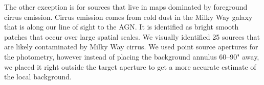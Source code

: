 The other exception is for sources that live in maps dominated by foreground cirrus emission. Cirrus emission comes from cold dust in the Milky Way galaxy that is along our line of sight to the AGN. It is identified as bright smooth patches that occur over large spatial scales. We visually identified 25 sources that are likely contaminated by Milky Way cirrus. We used point source apertures for the photometry, however instead of placing the background annulus 60--90" away, we placed it right outside the target aperture to get a more accurate estimate of the local background. 